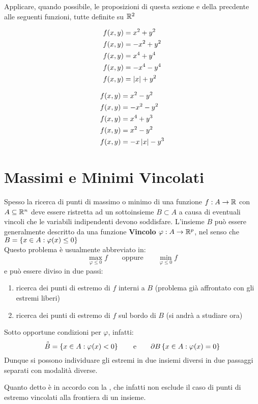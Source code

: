 \begin{exercise}
	Applicare, quando possibile, le proposizioni di questa sezione e della precdente alle seguenti funzioni, tutte definite su $\mathbb{R}^2$\\
	\begin{minipage}{0.49\linewidth}
		\begin{align*}
			f(x,y) &= x^2 + y^2\\
			f(x,y) &= -x^2 + y^2\\
			f(x,y) &= x^4 + y^4\\
			f(x,y) &= -x^4 - y^4\\
			f(x,y) &= \left|x\right| + y^2
		\end{align*}
	\end{minipage}
	\begin{minipage}{0.49\linewidth}
		\begin{align*}
			f(x,y) &= x^2 - y^2\\
			f(x,y) &= -x^2 - y^2\\
			f(x,y) &= x^4 + y^3\\
			f(x,y) &= x^2 - y^2\\
			f(x,y) &= -x \left|x\right| - y^3
		\end{align*}
	\end{minipage}
\end{exercise}

\newpage
\section{Massimi e Minimi Vincolati}
Spesso la ricerca di punti di massimo o minimo di una funzione $f:A \to \mathbb{R}$ con $A \subseteq \mathbb{R}^n$ deve essere ristretta ad un sottoinsieme $B \subset A$ a causa di eventuali vincoli che le variabili indipendenti devono soddisfare. L'insieme $B$ può essere generalmente descritto da una funzione \textbf{Vincolo} $\varphi: A \to \mathbb{R}^p$, nel senso che $B = \left\{x \in A: \varphi(x) \leq 0\right\}$\\
Questo problema è usualmente abbreviato in:
\[\max\limits_{\varphi \leq 0} f \qquad \text{oppure} \qquad \min\limits_{\varphi \leq 0} f\]
e può essere diviso in due passi:
\begin{enumerate}
	\item ricerca dei punti di estremo di $f$ interni a $B$ (problema già affrontato con gli estremi liberi)
	\item ricerca dei punti di estremo di $f$ sul bordo di $B$ (si andrà a studiare ora)
\end{enumerate}
Sotto opportune condizioni per $\varphi$, infatti:
\[\accentset{\circ}{B} = \left\{x\in A: \varphi(x) < 0\right\} \qquad \text{e} \qquad \partial B\left\{x\in A: \varphi(x) = 0\right\}\]
Dunque si possono individuare gli estremi in due insiemi diversi in due passaggi separati con modalità diverse.
\begin{note}
	Quanto detto è in accordo con la , che infatti non esclude il caso di punti di estremo vincolati alla frontiera di un insieme.
\end{note}

